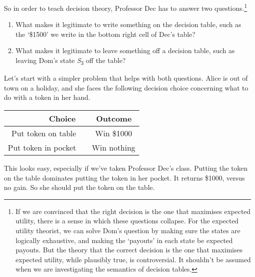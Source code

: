 \documentclass[
  10pt,
  letterpaper,
  DIV=11,
  numbers=noendperiod,
  twoside]{scrartcl}
\begin{document}
So in order to teach decision theory, Professor Dec has to answer two
questions.\footnote{If we are convinced that the right decision is the
  one that maximises expected utility, there is a sense in which these
  questions collapse. For the expected utility theorist, we can solve
  Dom's question by making sure the states are logically exhaustive, and
  making the `payouts' in each state be expected payouts. But the theory
  that the correct decision is the one that maximises expected utility,
  while plausibly true, is controversial. It shouldn't be assumed when
  we are investigating the semantics of decision tables.}

\begin{enumerate}
\def\labelenumi{\arabic{enumi}.}
\item
  What makes it legitimate to write something on the decision table,
  such as the `\$1500' we write in the bottom right cell of Dec's table?
\item
  What makes it legitimate to leave something off a decision table, such
  as leaving Dom's state \emph{S}\textsubscript{3} off the table?
\end{enumerate}

Let's start with a simpler problem that helps with both questions. Alice
is out of town on a holiday, and she faces the following decision choice
concerning what to do with a token in her hand.

\begin{longtable}[]{@{}rc@{}}
\toprule\noalign{}
\textbf{Choice}~ & ~\textbf{Outcome} \\
\midrule\noalign{}
\endhead
\bottomrule\noalign{}
\endlastfoot
Put token on table~ & ~Win \$1000 \\
Put token in pocket~ & ~Win nothing \\
\end{longtable}

This looks easy, especially if we've taken Professor Dec's class.
Putting the token on the table dominates putting the token in her
pocket. It returns \$1000, versus no gain. So she should put the token
on the table.
\end{document}
